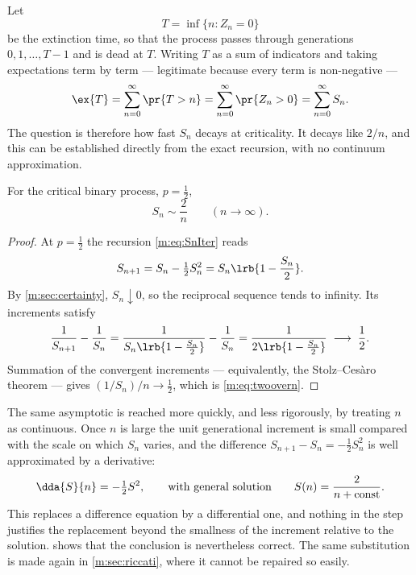 Let
\begin{equation*}
T = \inf\{n : Z_n = 0\}
\end{equation*}
be the extinction time, so that the process passes through generations
$0,1,\dots,T-1$ and is dead at $T$. Writing $T$ as a sum of indicators and taking
expectations term by term --- legitimate because every term is non-negative ---
\begin{equation}
\label{m:eq:ETsumSn}
\ex{T} = \sum_{n=0}^{\infty}\pr{T>n} = \sum_{n=0}^{\infty}\pr{Z_n>0}
= \sum_{n=0}^{\infty}S_n .
\end{equation}
The question is therefore how fast $S_n$ decays at criticality. It decays like
$2/n$, and this can be established directly from the exact recursion, with no
continuum approximation.

\begin{proposition}
\label{m:prop:criticalSn}
For the critical binary process, $p=\tfrac12$,
\begin{equation}
\label{m:eq:twoovern}
S_n \sim \frac{2}{n}\qquad(n\to\infty).
\end{equation}
\end{proposition}

\begin{proof}
At $p=\tfrac12$ the recursion \cref{m:eq:SnIter} reads
\begin{equation}
\label{m:eq:criticalrecursion}
S_{n+1} = S_n-\tfrac12S_n^2 = S_n\lrb{1-\frac{S_n}{2}} .
\end{equation}
By \cref{m:sec:certainty}, $S_n\downarrow0$, so the reciprocal sequence tends to
infinity. Its increments satisfy
\begin{equation}
\label{m:eq:reciprocalincrement}
\frac{1}{S_{n+1}}-\frac{1}{S_n}
= \frac{1}{S_n\lrb{1-\frac{S_n}{2}}}-\frac{1}{S_n}
= \frac{1}{2\lrb{1-\frac{S_n}{2}}}
\;\longrightarrow\;\frac12 .
\end{equation}
Summation of the convergent increments --- equivalently, the Stolz--Ces\`aro
theorem --- gives $(1/S_n)/n\to\tfrac12$, which is \cref{m:eq:twoovern}.
\end{proof}

\begin{remark}
\label{m:rem:continuumcritical}
The same asymptotic is reached more quickly, and less rigorously, by treating $n$ as
continuous. Once $n$ is large the unit generational increment is small compared with
the scale on which $S_n$ varies, and the difference
$S_{n+1}-S_n = -\tfrac12S_n^2$ is well approximated by a derivative:
\begin{equation*}
\dda{S}{n} = -\tfrac12 S^2,
\qquad\text{with general solution}\qquad
S(n) = \frac{2}{n+\text{const}} .
\end{equation*}
This replaces a difference equation by a differential one, and nothing in the step
justifies the replacement beyond the smallness of the increment relative to the
solution.  shows that the conclusion is nevertheless
correct. The same substitution is made again in \cref{m:sec:riccati}, where it
cannot be repaired so easily.
\end{remark}

